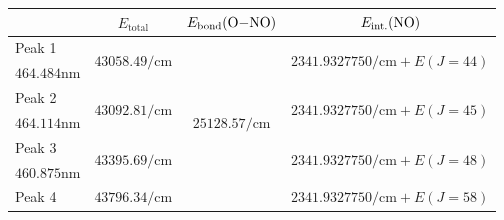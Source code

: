 \documentclass[aspectratio=43,scheme=plain]{ctexbeamer}
\begin{document}
	\begin{frame}{\insertsubsection}{\insertsubsubsection}
		\begin{table}[htbp]
			\centering
			\tiny
			\begin{tabularx}{0.9\textwidth}{lccc}
				\toprule
				                                  &                       $E_\text{total}$                        &         $E_\text{bond}(\ce{O-NO})$\footfullcite{ono}          &                            $E_\text{int.}(\ce{NO})$                            \\ \midrule
				Peak 1                            & \multirow{2}[2]{*}{$\num{43058.49}\unit{\per \centi \meter}$} & \multirow{8}[8]{*}{$\num{25128.57}\unit{\per \centi \meter}$} & \multirow{2}[2]{*}{$\num{2341.9327750}\unit{\per \centi \meter}+ E( J = 44 )$} \\
				$\num{464.484}\unit{\nano\meter}$ &                                                               &                                                               &                                                                                \\ \cmidrule{1-2}\cmidrule{4-4}
				Peak 2                            & \multirow{2}[2]{*}{$\num{43092.81}\unit{\per \centi \meter}$} &                                                               & \multirow{2}[2]{*}{$\num{2341.9327750}\unit{\per \centi \meter}+ E( J = 45 )$} \\
				$\num{464.114}\unit{\nano\meter}$ &                                                               &                                                               &                                                                                \\ \cmidrule{1-2}\cmidrule{4-4}
				Peak 3                            & \multirow{2}[2]{*}{$\num{43395.69}\unit{\per \centi \meter}$} &                                                               & \multirow{2}[2]{*}{$\num{2341.9327750}\unit{\per \centi \meter}+ E( J = 48 )$} \\
				$\num{460.875}\unit{\nano\meter}$ &                                                               &                                                               &                                                                                \\ \cmidrule{1-2}\cmidrule{4-4}
				Peak 4                            & \multirow{2}[2]{*}{$\num{43796.34}\unit{\per \centi \meter}$} &                                                               & \multirow{2}[2]{*}{$\num{2341.9327750}\unit{\per \centi \meter}+ E( J = 58 )$} \\

\end{tabularx}
\end{table}
\end{frame}
\end{document}
